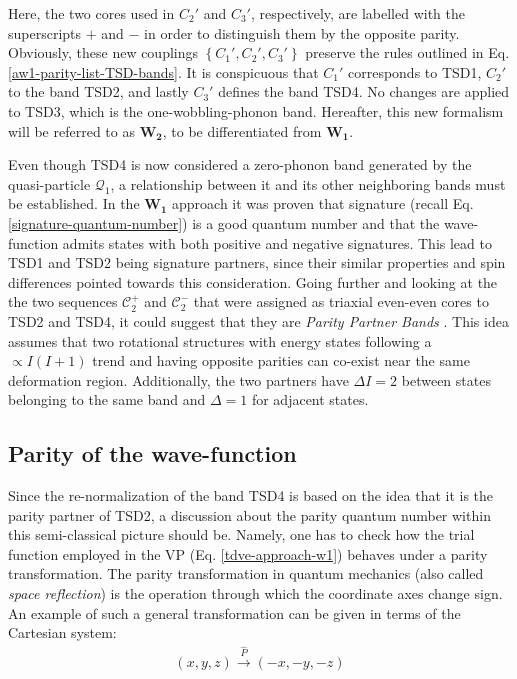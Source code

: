 Here, the two cores used in $C_2'$ and $C_3'$, respectively, are labelled with the superscripts $+$ and $-$ in order to distinguish them by the opposite parity. Obviously, these new couplings $\left\{C_1',C_2',C_3'\right\}$ preserve the rules outlined in Eq. \ref{aw1-parity-list-TSD-bands}. It is conspicuous that $C_1'$ corresponds to TSD1, $C_2'$ to the band TSD2, and lastly $C_3'$ defines the band TSD4. No changes are applied to TSD3, which is the one-wobbling-phonon band. Hereafter, this new formalism will be referred to as $\mathbf{W_2}$, to be differentiated from $\mathbf{W_1}$.

Even though TSD4 is now considered a zero-phonon band generated by the quasi-particle $\mathcal{Q}_1$, a relationship between it and its other neighboring bands must be established. In the $\mathbf{W_1}$ approach it was proven \cite{raduta2020approach} that signature (recall Eq. \ref{signature-quantum-number}) is a good quantum number and that the wave-function admits states with both positive and negative signatures. This lead to TSD1 and TSD2 being signature partners, since their similar properties and spin differences pointed towards this consideration. Going further and looking at the the two sequences $\mathscr{C}_2^+$ and $\mathscr{C}_2^-$ that were assigned as triaxial even-even cores to TSD2 and TSD4, it could suggest that they are \emph{Parity Partner Bands} \cite{poenaru2021parity}. This idea assumes that two rotational structures with energy states following a $\propto I(I+1)$ trend and having opposite parities can co-exist near the same deformation region. Additionally, the two partners have $\Delta I=2$ between states belonging to the same band and $\Delta = 1$ for adjacent states.

\subsection{Parity of the wave-function}

Since the re-normalization of the band TSD4 is based on the idea that it is the parity partner of TSD2, a discussion about the parity quantum number within this semi-classical picture should be. Namely, one has to check how the trial function employed in the VP (Eq. \ref{tdve-approach-w1}) behaves under a parity transformation. The parity transformation in quantum mechanics (also called \emph{space reflection}) is the operation through which the coordinate axes change sign. An example of such a general transformation can be given in terms of the Cartesian system:
\begin{align}
    (x,y,z)\stackrel{\hat{P}}{\longrightarrow}(-x,-y,-z)
\end{align}

